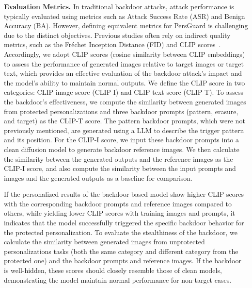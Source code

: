 \noindent \textbf{Evaluation Metrics.} 
In traditional backdoor attacks, attack performance is typically evaluated using metrics such as Attack Success Rate (ASR) and Benign Accuracy (BA). However, defining equivalent metrics for PersGuard is challenging due to the distinct objectives. Previous studies often rely on indirect quality metrics, such as the Fréchet Inception Distance (FID) and CLIP scores~\cite{naseh2024injecting,wang2024eviledit}. Accordingly, we adopt CLIP scores (cosine similarity between CLIP embeddings) to assess the performance of generated images relative to target images or target text, which provides an effective evaluation of the backdoor attack’s impact and the model's ability to maintain normal outputs. We define the CLIP score in two categories: CLIP-image score (CLIP-I) and CLIP-text score (CLIP-T). To assess the backdoor's effectiveness, we compute the similarity between generated images from protected personalizations and three backdoor prompts (pattern, erasure, and target) as the CLIP-T score. The pattern backdoor prompts, which were not previously mentioned, are generated using a LLM to describe the trigger pattern and its position. For the CLIP-I score, we input these backdoor prompts into a clean diffusion model to generate backdoor reference images. We then calculate the similarity between the generated outputs and the reference images as the CLIP-I score, and also compute the similarity between the input prompts and images and the generated outputs as a baseline for comparison.


If the personalized results of the backdoor-based model show higher CLIP scores with the corresponding backdoor prompts and reference images compared to others, while yielding lower CLIP scores with training images and prompts, it indicates that the model successfully triggered the specific backdoor behavior for the protected personalization. To evaluate the stealthiness of the backdoor, we calculate the similarity between generated images from unprotected personalizations tasks (both the same category and different category from the protected one) and the backdoor prompts and reference images. If the backdoor is well-hidden, these scores should closely resemble those of clean models, demonstrating the model maintain normal performance for non-target cases.


